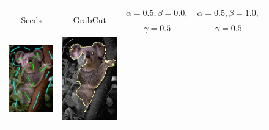 \begin{figure}
\center
\begin{tabular}{cccc}
\multirow{2}{*}{Seeds} & \multirow{2}{*}{GrabCut} & $\alpha=0.5, \beta=0.0,$ & $\alpha=0.5, \beta=1.0,$ \\
& & $\gamma=0.5$ & $\gamma=0.5$\\
 	\includegraphics[scale=0.25]{figures/chapter6/segmentation/coala/mt_improve/radius_5/data_0.50/sq_0.00/length_0.50/it_50/seeds.png} & 
 	\includegraphics[scale=0.25]{figures/chapter6/segmentation/coala/mt_improve/radius_5/data_0.50/sq_0.00/length_0.50/it_50/gc-seg.png} & 

\end{tabular}
\end{figure}
